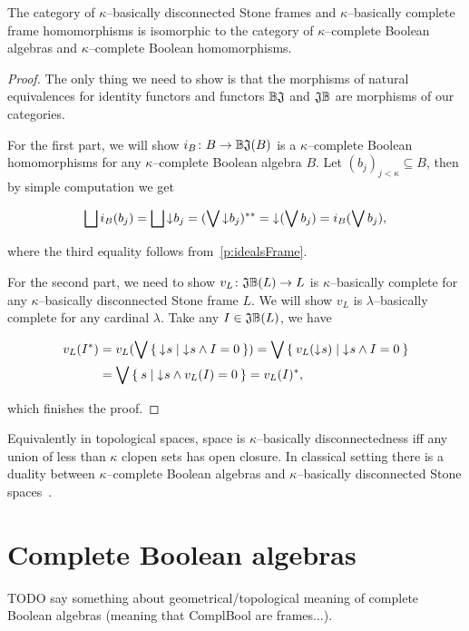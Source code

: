 \begin{theorem*}
    The category of $\kappa$--basically disconnected Stone frames and $\kappa$--basically complete frame homomorphisms is isomorphic to the category of $\kappa$--complete Boolean algebras and $\kappa$--complete Boolean homomorphisms.
\end{theorem*}
\begin{proof}
    The only thing we need to show is that the morphisms of natural equivalences for identity functors and functors $\mathbb{B}\mathfrak{J}$ and $\mathfrak{J}\mathbb{B}$ are morphisms of our categories.

    For the first part, we will show $i_B\colon B \to \mathbb{B}\mathfrak{J}(B)$ is a $\kappa$--complete Boolean homomorphisms for any $\kappa$--complete Boolean algebra $B$. Let $(b_j)_{j < \kappa} \subseteq B$, then by simple computation we get

    $$
        \bigsqcup i_B(b_j) = \bigsqcup \mathord{\downarrow}\mkern1mu b_j = (\bigvee \mathord{\downarrow}\mkern1mu b_j)^{**} = \mathord{\downarrow}\mkern1mu (\bigvee b_j) = i_B(\bigvee b_j),
    $$

    \noindent where the third equality follows from~\ref{p:idealsFrame}.

    For the second part, we need to show $v_L\colon \mathfrak{J}\mathbb{B}(L) \to L$ is $\kappa$--basically complete for any $\kappa$--basically disconnected Stone frame $L$. We will show $v_L$ is $\lambda$--basically complete for any cardinal $\lambda$. Take any $I \in \mathfrak{J}\mathbb{B}(L)$, we have

    \begin{align*}
        v_L(I^*) &= v_L(\bigvee \Set{ \mathord{\downarrow}\mkern1mus | \mathord{\downarrow}\mkern1mus \wedge I = 0 })
                  = \bigvee \Set{ v_L(\mathord{\downarrow}\mkern1mus) | \mathord{\downarrow}\mkern1mus \wedge I = 0 } \\
                 &= \bigvee \Set{ s | \mathord{\downarrow}\mkern1mus \wedge v_L(I) = 0 } = v_L(I)^*,
    \end{align*}

    \noindent which finishes the proof.
\end{proof}

Equivalently in topological spaces, space is $\kappa$--basically disconnectedness iff any union of less than $\kappa$ clopen sets has open closure. In classical setting there is a duality between $\kappa$--complete Boolean algebras and $\kappa$--basically disconnected Stone spaces~\cite{monk1989handbook}.



\section{Complete Boolean algebras}
TODO say something about geometrical/topological meaning of complete Boolean algebras (meaning that ComplBool are frames...).

